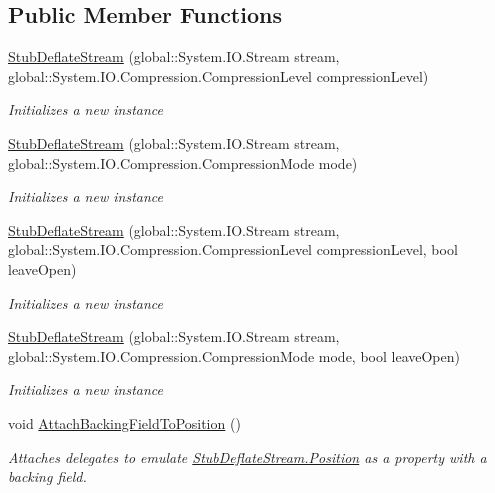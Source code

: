 \subsection*{Public Member Functions}
\begin{DoxyCompactItemize}
\item 
\hyperlink{class_system_1_1_i_o_1_1_compression_1_1_fakes_1_1_stub_deflate_stream_a515137fd731c604d1451d596f84c2b67}{Stub\-Deflate\-Stream} (global\-::\-System.\-I\-O.\-Stream stream, global\-::\-System.\-I\-O.\-Compression.\-Compression\-Level compression\-Level)
\begin{DoxyCompactList}\small\item\em Initializes a new instance\end{DoxyCompactList}\item 
\hyperlink{class_system_1_1_i_o_1_1_compression_1_1_fakes_1_1_stub_deflate_stream_a65cc3a9d6887a342ecea1ddaab3d09e7}{Stub\-Deflate\-Stream} (global\-::\-System.\-I\-O.\-Stream stream, global\-::\-System.\-I\-O.\-Compression.\-Compression\-Mode mode)
\begin{DoxyCompactList}\small\item\em Initializes a new instance\end{DoxyCompactList}\item 
\hyperlink{class_system_1_1_i_o_1_1_compression_1_1_fakes_1_1_stub_deflate_stream_a1985869a4abf45fa8ec5cbd28b5fff1e}{Stub\-Deflate\-Stream} (global\-::\-System.\-I\-O.\-Stream stream, global\-::\-System.\-I\-O.\-Compression.\-Compression\-Level compression\-Level, bool leave\-Open)
\begin{DoxyCompactList}\small\item\em Initializes a new instance\end{DoxyCompactList}\item 
\hyperlink{class_system_1_1_i_o_1_1_compression_1_1_fakes_1_1_stub_deflate_stream_a78b4225b9a0add36edb06f6efc8a4ae2}{Stub\-Deflate\-Stream} (global\-::\-System.\-I\-O.\-Stream stream, global\-::\-System.\-I\-O.\-Compression.\-Compression\-Mode mode, bool leave\-Open)
\begin{DoxyCompactList}\small\item\em Initializes a new instance\end{DoxyCompactList}\item 
void \hyperlink{class_system_1_1_i_o_1_1_compression_1_1_fakes_1_1_stub_deflate_stream_a00af2eda8eae3e1724d558ca8d2f28f5}{Attach\-Backing\-Field\-To\-Position} ()
\begin{DoxyCompactList}\small\item\em Attaches delegates to emulate \hyperlink{class_system_1_1_i_o_1_1_compression_1_1_fakes_1_1_stub_deflate_stream_ac69e67d36e9ded469f498f752c3ecefe}{Stub\-Deflate\-Stream.\-Position} as a property with a backing field.\end{DoxyCompactList}\item 

\end{DoxyCompactItemize}
